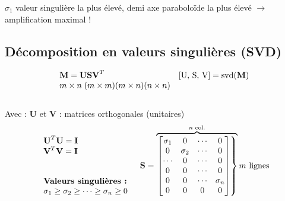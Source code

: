 \documentclass[document.tex]{subfiles}
\begin{document}
 
 $\sigma_1$ valeur singulière la plus élevé, demi axe paraboloïde la plus élevé $\rightarrow$ amplification maximal !

\subsection{Décomposition en valeurs singulières (SVD)}

$$ \begin{array}{l l}
\textbf{M} = \textbf{U} \textbf{S} \textbf{V}^T & [\text{U, S, V}]=\text{svd}(\textbf{M}) \\
m \times n \; (m \times m)(m \times n)(n \times n)
\end{array} $$\\

Avec : \textbf{U} et \textbf{V} : matrices orthogonales (unitaires)
$$ 
\begin{array}{c c}
	\begin{array}{l}
		\textbf{U}^T \textbf{U} = \textbf{I} \\
		\textbf{V}^T \textbf{V} = \textbf{I} \\[24pt]
		\textbf{Valeurs singulières :} \\
		\sigma_1 \geq \sigma_2 \geq \cdots \geq \sigma_n \geq 0 \\
	\end{array}
& 
\textbf{S} = 
	\overbrace{\begin{rcases}\begin{bmatrix}
	\sigma_1 & 0 & \cdots & 0 \\ 0 & \sigma_2 & \cdots & 0 \\ \cdots & 0 & \cdots & 0 \\ 0 & 0 & \cdots & 0 \\ 0 & 0 & \cdots & \sigma_n \\ 0 & 0 & 0 & 0 
	\end{bmatrix}\end{rcases}}^{n \text{ col.}} m \text{ lignes}
\end{array} 
$$
\end{document}
